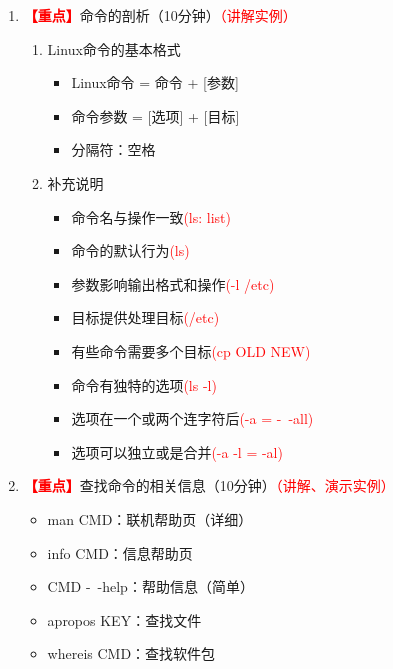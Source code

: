 \documentclass{TIJMUjiaoanLL}
\begin{document}
\begin{enumerate}
  \item \textcolor{red}{\textbf{【重点】}}命令的剖析（10分钟）\textcolor{red}{（讲解实例）}
    \begin{enumerate}
      \item Linux命令的基本格式
	\begin{itemize}
	  \item Linux命令 = 命令 + [参数]
	  \item 命令参数 = [选项] + [目标]
	  \item 分隔符：空格
	\end{itemize}
      \item 补充说明
	\vspace*{-10pt}
	\begin{multicols}{2}
	\begin{itemize}
	  \item 命令名与操作一致\textcolor{red}{(ls: list)}
	  \item 命令的默认行为\textcolor{red}{(ls)}
	  \item 参数影响输出格式和操作\textcolor{red}{(-l /etc)}
	  \item 目标提供处理目标\textcolor{red}{(/etc)}
	  \item 有些命令需要多个目标\textcolor{red}{(cp OLD NEW)}
	  \item 命令有独特的选项\textcolor{red}{(ls -l)}
	  \item 选项在一个或两个连字符后\textcolor{red}{(-a = -\ -all)}
	  \item 选项可以独立或是合并\textcolor{red}{(-a -l = -al)}
	\end{itemize}
      \end{multicols}
	\vspace*{-10pt}
    \end{enumerate}

  \item \textcolor{red}{\textbf{【重点】}}查找命令的相关信息（10分钟）\textcolor{red}{（讲解、演示实例）}
      \begin{itemize}
	\item man CMD：联机帮助页（详细）
	\item info CMD：信息帮助页
	\item CMD -\ -help：帮助信息（简单）
	\item apropos KEY：查找文件
	\item whereis CMD：查找软件包
      \end{itemize}


\end{enumerate}
\end{document}
